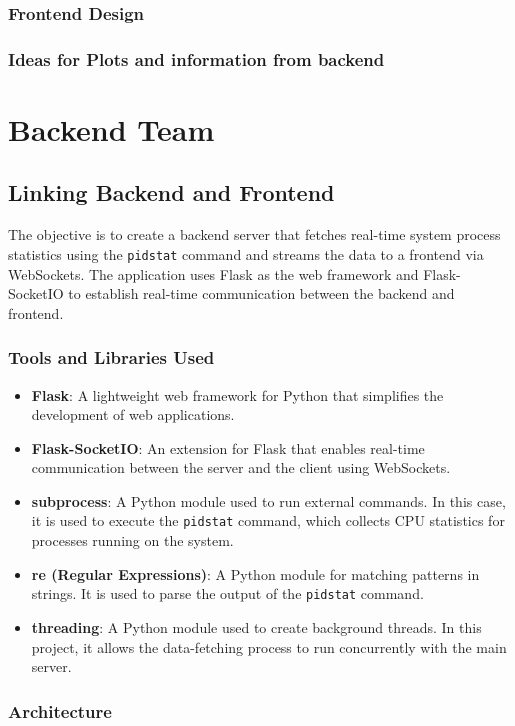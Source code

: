 \documentclass[12pt]{article}
\begin{document}
\subsubsection{Frontend Design}
\subsubsection{Ideas for Plots and information from backend}
\section{Backend Team}
\subsection{Linking Backend and Frontend}
The objective is to create a backend server that fetches real-time system process statistics using the \texttt{pidstat} command and streams the data to a frontend via WebSockets. The application uses Flask as the web framework and Flask-SocketIO to establish real-time communication between the backend and frontend.

\subsubsection{Tools and Libraries Used}

\begin{itemize}
    \item \textbf{Flask}: A lightweight web framework for Python that simplifies the development of web applications.
    \item \textbf{Flask-SocketIO}: An extension for Flask that enables real-time communication between the server and the client using WebSockets.
    \item \textbf{subprocess}: A Python module used to run external commands. In this case, it is used to execute the \texttt{pidstat} command, which collects CPU statistics for processes running on the system.
    \item \textbf{re (Regular Expressions)}: A Python module for matching patterns in strings. It is used to parse the output of the \texttt{pidstat} command.
    \item \textbf{threading}: A Python module used to create background threads. In this project, it allows the data-fetching process to run concurrently with the main server.
\end{itemize}

\subsubsection{Architecture}
\end{document}
